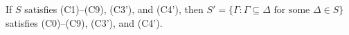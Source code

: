 If $S$ satisfies (C1)--(C9), (C3'), and (C4'), then $S' = \{\Gamma : \Gamma \subseteq \Delta \text{ for some } \Delta \in S\}$ satisfies (C0)--(C9), (C3'), and (C4').
